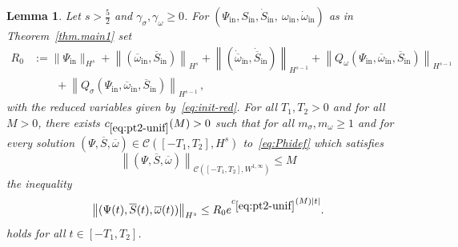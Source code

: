 \documentclass[10pt]{amsart}
\newtheorem{lemm}[theo]{Lemma}\newtheorem{prop}[theo]{Proposition}\newtheorem{coro}[theo]{Corollary}\newtheorem{conj}[theo]{Conjecture}
\theoremstyle{definition}\newtheorem{defi}[theo]{Definition}\newtheorem{rema}[theo]{Remark}\newtheorem{exam}[theo]{Example}\newtheorem{exem}[theo]{Example}\newtheorem{nota}[theo]{Notation}
\newcommand{\rmin}{\mathrm{in}}
\newcommand{\cC}{\mathcal{C}}
\begin{document}
\begin{lemm}\label{lem:unif-exist}
Let $s>\tfrac52$ and $\gamma_\sigma, \gamma_\omega\geq 0$. For $(\Psi_\rmin, S_\rmin, \dot S_\rmin, \ \omega_\rmin, \dot \omega_\rmin)$ as in Theorem~\ref{thm.main1} set
\begin{align*}
R_0&:= \|\Psi_\rmin\|_{H^s} +\left\|(\overline{\omega}_\rmin, \overline{S}_\rmin)\right\|_{H^s} + \left\|(\dot{\overline{\omega}}_\rmin, \dot{\overline{S}}_\rmin)\right\|_{H^{s-1}} +\left\|Q_\omega(\Psi_\rmin, \overline{\omega}_\rmin, \overline{S}_\rmin)\right\|_{H^{s-1}}\\
&\qquad+ \left\|Q_\sigma(\Psi_\rmin, \overline{\omega}_\rmin, \overline{S}_\rmin)\right\|_{H^{s-1}}\,,
\end{align*}
with the reduced variables given by~\eqref{eq:init-red}. For all $T_1,T_2>0$ and for all $M>0$, there exists $c_{\eqref{eq:pt2-unif}}(M)>0$ such that for all $m_\sigma,m_\omega \geq 1$ and for every solution $(\Psi, \overline{S},\overline{\omega})\in \cC([-T_1, T_2],H^s)$ to~\eqref{eq:Phidef} which satisfies
\begin{equation*}
\left\|(\Psi, \overline{S},\overline{\omega})\right\|_{\cC\left([-T_1,T_2],W^{1,\infty}\right)} \leq M
\end{equation*}
the inequality
\begin{equation}\label{eq:pt2-unif}
\left\|(\Psi(t), \overline{S}(t), \overline{\omega}(t))\right\|_{H^s} \leq R_0 e^{c_{\eqref{eq:pt2-unif}}(M) |t|}.
\end{equation}
holds for all $t\in [-T_1, T_2]$.
\end{lemm}
\end{document}
